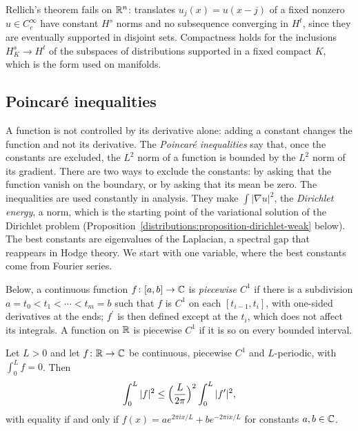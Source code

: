 \begin{counterexample}\label{distributions:counterexample-rellich-rn}
Rellich's theorem fails on $\mathbb{R}^n$: translates $u_j(x) = u(x - j)$ of a fixed nonzero $u \in C_c^\infty$ have constant $H^s$ norms and no subsequence converging in $H^t$, since they are eventually supported
in disjoint sets. Compactness holds for the inclusions $H^s_K \to H^t$ of the subspaces of distributions supported in a fixed compact $K$, which is the form used on manifolds.
\end{counterexample}

\subsection{Poincar\'e inequalities}\label{distributions:subsection-poincare}

A function is not controlled by its derivative alone: adding a constant changes the function and not its derivative. The \emph{Poincar\'e inequalities} say that, once the constants are excluded,
the $L^2$ norm of a function is bounded by the $L^2$ norm of its gradient. There are two ways to exclude the constants: by asking that the function vanish on the boundary, or by asking that its mean
be zero. The inequalities are used constantly in analysis. They make $\int|\nabla u|^2$, the \emph{Dirichlet energy}, a norm, which is the starting point of the variational solution of
the Dirichlet problem (Proposition~\ref{distributions:proposition-dirichlet-weak} below). The best constants are eigenvalues of the Laplacian, a spectral gap that reappears in Hodge theory. We start
with one variable, where the best constants come from Fourier series.

Below, a continuous function $f \colon [a, b] \to \mathbb{C}$ is \emph{piecewise $C^1$} if there is a subdivision $a = t_0 < t_1 < \cdots < t_m = b$ such that $f$ is $C^1$ on each $[t_{i-1}, t_i]$, with one-sided
derivatives at the ends; $f^{\prime}$ is then defined except at the $t_i$, which does not affect its integrals. A function on $\mathbb{R}$ is piecewise $C^1$ if it is so on every bounded interval.

\begin{proposition}\label{distributions:proposition-wirtinger}
Let $L > 0$ and let $f \colon \mathbb{R} \to \mathbb{C}$ be continuous, piecewise $C^1$ and $L$-periodic, with $\int_0^Lf = 0$. Then
\[
\int_0^L|f|^2 \leq \Bigl(\frac{L}{2\pi}\Bigr)^2\int_0^L|f^{\prime}|^2,
\]
with equality if and only if $f(x) = ae^{2\pi ix/L} + be^{-2\pi ix/L}$ for constants $a, b \in \mathbb{C}$.
\end{proposition}

